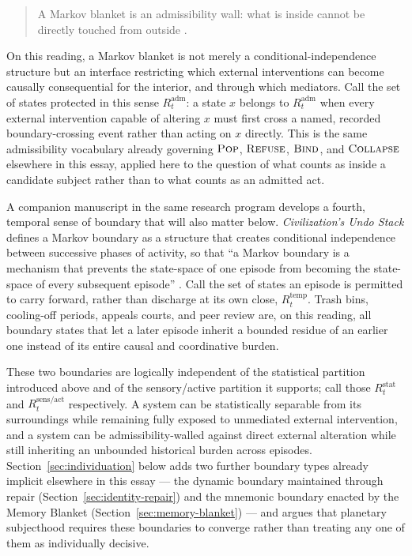 \documentclass[11pt]{article}
\newcommand{\Pop}{\textsc{Pop}}
\newcommand{\Refuse}{\textsc{Refuse}}
\newcommand{\Bind}{\textsc{Bind}}
\newcommand{\Collapse}{\textsc{Collapse}}
\begin{document}
\begin{quote}
A Markov blanket is an admissibility wall: what is inside cannot be directly touched from outside \cite{flyxionCPR}.
\end{quote}

\noindent On this reading, a Markov blanket is not merely a conditional-independence structure but an interface restricting which external interventions can become causally consequential for the interior, and through which mediators. Call the set of states protected in this sense $R^{\mathrm{adm}}_t$: a state $x$ belongs to $R^{\mathrm{adm}}_t$ when every external intervention capable of altering $x$ must first cross a named, recorded boundary-crossing event rather than acting on $x$ directly. This is the same admissibility vocabulary already governing $\Pop$, $\Refuse$, $\Bind$, and $\Collapse$ elsewhere in this essay, applied here to the question of what counts as inside a candidate subject rather than to what counts as an admitted act.

A companion manuscript in the same research program develops a fourth, temporal sense of boundary that will also matter below. \emph{Civilization's Undo Stack} defines a Markov boundary as a structure that creates conditional independence between successive phases of activity, so that ``a Markov boundary is a mechanism that prevents the state-space of one episode from becoming the state-space of every subsequent episode'' \cite{flyxionUndoStack}. Call the set of states an episode is permitted to carry forward, rather than discharge at its own close, $R^{\mathrm{temp}}_t$. Trash bins, cooling-off periods, appeals courts, and peer review are, on this reading, all boundary states that let a later episode inherit a bounded residue of an earlier one instead of its entire causal and coordinative burden.

These two boundaries are logically independent of the statistical partition introduced above and of the sensory/active partition it supports; call those $R^{\mathrm{stat}}_t$ and $R^{\mathrm{sens/act}}_t$ respectively. A system can be statistically separable from its surroundings while remaining fully exposed to unmediated external intervention, and a system can be admissibility-walled against direct external alteration while still inheriting an unbounded historical burden across episodes. Section~\ref{sec:individuation} below adds two further boundary types already implicit elsewhere in this essay --- the dynamic boundary maintained through repair (Section~\ref{sec:identity-repair}) and the mnemonic boundary enacted by the Memory Blanket (Section~\ref{sec:memory-blanket}) --- and argues that planetary subjecthood requires these boundaries to converge rather than treating any one of them as individually decisive.
\end{document}
